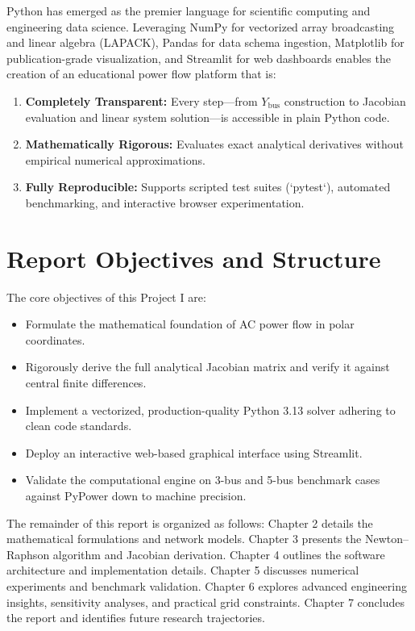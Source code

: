 \documentclass[12pt,a4paper,oneside]{report}
\begin{document}
Python has emerged as the premier language for scientific computing and engineering data science. Leveraging NumPy for vectorized array broadcasting and linear algebra (LAPACK), Pandas for data schema ingestion, Matplotlib for publication-grade visualization, and Streamlit for web dashboards enables the creation of an educational power flow platform that is:
\begin{enumerate}
    \item \textbf{Completely Transparent:} Every step---from $Y_{\text{bus}}$ construction to Jacobian evaluation and linear system solution---is accessible in plain Python code.
    \item \textbf{Mathematically Rigorous:} Evaluates exact analytical derivatives without empirical numerical approximations.
    \item \textbf{Fully Reproducible:} Supports scripted test suites (`pytest`), automated benchmarking, and interactive browser experimentation.
\end{enumerate}

\section{Report Objectives and Structure}
The core objectives of this Project I are:
\begin{itemize}
    \item Formulate the mathematical foundation of AC power flow in polar coordinates.
    \item Rigorously derive the full analytical Jacobian matrix and verify it against central finite differences.
    \item Implement a vectorized, production-quality Python 3.13 solver adhering to clean code standards.
    \item Deploy an interactive web-based graphical interface using Streamlit.
    \item Validate the computational engine on 3-bus and 5-bus benchmark cases against PyPower down to machine precision.
\end{itemize}

The remainder of this report is organized as follows: Chapter 2 details the mathematical formulations and network models. Chapter 3 presents the Newton--Raphson algorithm and Jacobian derivation. Chapter 4 outlines the software architecture and implementation details. Chapter 5 discusses numerical experiments and benchmark validation. Chapter 6 explores advanced engineering insights, sensitivity analyses, and practical grid constraints. Chapter 7 concludes the report and identifies future research trajectories.
\end{document}
